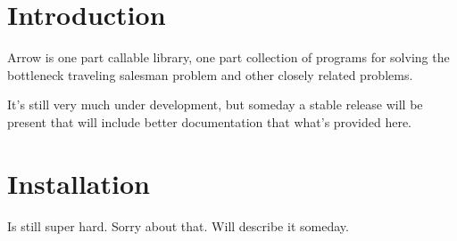 \hypertarget{index_intro_sec}{}\section{Introduction}\label{index_intro_sec}
Arrow is one part callable library, one part collection of programs for solving the bottleneck traveling salesman problem and other closely related problems.

It's still very much under development, but someday a stable release will be present that will include better documentation that what's provided here.\hypertarget{index_install_sec}{}\section{Installation}\label{index_install_sec}
Is still super hard. Sorry about that. Will describe it someday. 